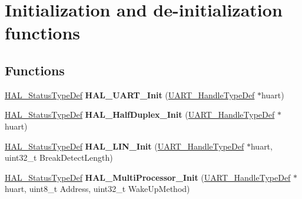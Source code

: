 \hypertarget{group___u_a_r_t___exported___functions___group1}{\section{Initialization and de-\/initialization functions}
\label{group___u_a_r_t___exported___functions___group1}
}
\subsection*{Functions}
\begin{DoxyCompactItemize}
\item 
\hypertarget{group___u_a_r_t___exported___functions___group1_gabe47045024787099b0bfa82bbe7b0b6a}{\hyperlink{stm32l1xx__hal__def_8h_a63c0679d1cb8b8c684fbb0632743478f}{H\-A\-L\-\_\-\-Status\-Type\-Def} {\bfseries H\-A\-L\-\_\-\-U\-A\-R\-T\-\_\-\-Init} (\hyperlink{struct_u_a_r_t___handle_type_def}{U\-A\-R\-T\-\_\-\-Handle\-Type\-Def} $\ast$huart)}\label{group___u_a_r_t___exported___functions___group1_gabe47045024787099b0bfa82bbe7b0b6a}

\item 
\hypertarget{group___u_a_r_t___exported___functions___group1_ga927245827265eff1f3580a0121efd424}{\hyperlink{stm32l1xx__hal__def_8h_a63c0679d1cb8b8c684fbb0632743478f}{H\-A\-L\-\_\-\-Status\-Type\-Def} {\bfseries H\-A\-L\-\_\-\-Half\-Duplex\-\_\-\-Init} (\hyperlink{struct_u_a_r_t___handle_type_def}{U\-A\-R\-T\-\_\-\-Handle\-Type\-Def} $\ast$huart)}\label{group___u_a_r_t___exported___functions___group1_ga927245827265eff1f3580a0121efd424}

\item 
\hypertarget{group___u_a_r_t___exported___functions___group1_ga27e4497270bd06434e3965e4b06f5516}{\hyperlink{stm32l1xx__hal__def_8h_a63c0679d1cb8b8c684fbb0632743478f}{H\-A\-L\-\_\-\-Status\-Type\-Def} {\bfseries H\-A\-L\-\_\-\-L\-I\-N\-\_\-\-Init} (\hyperlink{struct_u_a_r_t___handle_type_def}{U\-A\-R\-T\-\_\-\-Handle\-Type\-Def} $\ast$huart, uint32\-\_\-t Break\-Detect\-Length)}\label{group___u_a_r_t___exported___functions___group1_ga27e4497270bd06434e3965e4b06f5516}

\item 
\hypertarget{group___u_a_r_t___exported___functions___group1_gaae1b49f0cb62235141807d8cbc61bc4d}{\hyperlink{stm32l1xx__hal__def_8h_a63c0679d1cb8b8c684fbb0632743478f}{H\-A\-L\-\_\-\-Status\-Type\-Def} {\bfseries H\-A\-L\-\_\-\-Multi\-Processor\-\_\-\-Init} (\hyperlink{struct_u_a_r_t___handle_type_def}{U\-A\-R\-T\-\_\-\-Handle\-Type\-Def} $\ast$huart, uint8\-\_\-t Address, uint32\-\_\-t Wake\-Up\-Method)}\label{group___u_a_r_t___exported___functions___group1_gaae1b49f0cb62235141807d8cbc61bc4d}


\end{DoxyCompactItemize}
